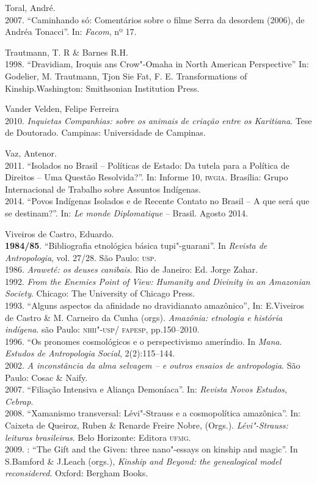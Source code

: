 \begin{bibliohedra}
Toral, André.\\
2007. ``Caminhando só: Comentários sobre o filme Serra da
desordem (2006), de Andréa Tonacci''. In: \emph{Facom}, nº 17.

Trautmann, T. R \& Barnes R.H.\\
1998. ``Dravidiam, Iroquis ans Crow"-Omaha in North American
Perspective'' In: Godelier, M. Trautmann, Tjon Sie Fat, F. E.
Transformations of Kinship.Washington: Smithsonian Institution Press.

Vander Velden, Felipe Ferreira\\
2010. \emph{Inquietas Companhias: sobre os animais de criação
entre os Karitiana}. Tese de Doutorado. Campinas: Universidade de
Campinas.

Vaz, Antenor.\\
2011. ``Isolados no Brasil -- Políticas de Estado: Da tutela
para a Política de Direitos -- Uma Questão Resolvida?''. In: Informe 10,
\textsc{iwgia}. Brasília: Grupo Internacional de Trabalho sobre Assuntos
Indígenas.\\
2014. ``Povos Indígenas Isolados e de Recente Contato no Brasil
-- A que será que se destinam?''. In: \emph{Le monde Diplomatique} --
Brasil. Agosto 2014.

Viveiros de Castro, Eduardo.\\
\textbf{1984/85}. ``Bibliografia etnológica básica tupi"-guarani''. In
\emph{Revista de Antropologia}, vol. 27/28. São Paulo: \textsc{usp}.\\
1986. \emph{Araweté: os deuses canibais}. Rio de Janeiro: Ed. Jorge
Zahar.\\
1992. \emph{From the Enemies Point of View: Humanity and
Divinity in an Amazonian Society}. Chicago: The University of Chicago
Press.\\
1993. ``Alguns aspectos da afinidade no dravidianato amazônico'',
In: E.Viveiros de Castro \& M. Carneiro da Cunha (orgs). \emph{Amazônia:
etnologia e história indígena}. são Paulo: \textsc{nhii}"-\textsc{usp}/ \textsc{fapesp},
pp.150--2010.\\
1996. ``Os pronomes cosmológicos e o perspectivismo ameríndio.
In \emph{Mana}. \emph{Estudos de Antropologia Social}, 2(2):115--144.\\
2002. \emph{A inconstância da alma selvagem -- e outros ensaios
de antropologia}. São Paulo: Cosac \& Naify.\\
2007. ``Filiação Intensiva e Aliança Demoníaca''. In:
\emph{Revista Novos Estudos, Cebrap}.\\
2008. ``Xamanismo transversal: Lévi"-Strauss e a cosmopolítica
amazônica''. In: Caixeta de Queiroz, Ruben \& Renarde Freire Nobre,
(Orgs.). \emph{Lévi"-Strauss: leituras brasileiras}. Belo Horizonte:
Editora \textsc{ufmg}.\\
2009. : ``The Gift and the Given: three nano"-essays on kinship
and magic''. In S.Bamford \& J.Leach (orgs.), \emph{Kinship and Beyond:
the genealogical model reconsidered}. Oxford: Bergham Books.


\end{bibliohedra}
